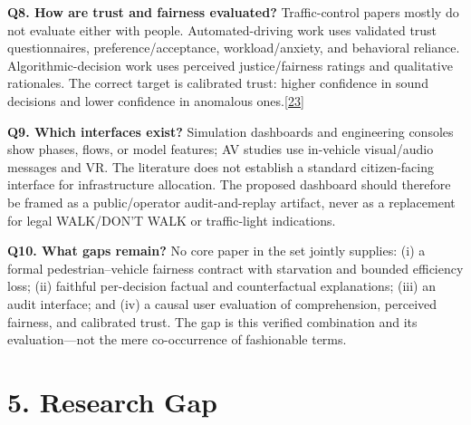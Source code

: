 \documentclass[
  english,
  11pt,
  a4paper,
]{article}
\begin{document}
\textbf{Q8. How are trust and fairness evaluated?} Traffic-control
papers mostly do not evaluate either with people. Automated-driving work
uses validated trust questionnaires, preference/acceptance,
workload/anxiety, and behavioral reliance. Algorithmic-decision work
uses perceived justice/fairness ratings and qualitative rationales. The
correct target is calibrated trust: higher confidence in sound decisions
and lower confidence in anomalous ones.\hyperref[source-23]{[23]}

\textbf{Q9. Which interfaces exist?} Simulation dashboards and
engineering consoles show phases, flows, or model features; AV studies
use in-vehicle visual/audio messages and VR. The literature does not
establish a standard citizen-facing interface for infrastructure
allocation. The proposed dashboard should therefore be framed as a
public/operator audit-and-replay artifact, never as a replacement for
legal WALK/DON'T WALK or traffic-light indications.

\textbf{Q10. What gaps remain?} No core paper in the set jointly
supplies: (i) a formal pedestrian--vehicle fairness contract with
starvation and bounded efficiency loss; (ii) faithful per-decision
factual and counterfactual explanations; (iii) an audit interface; and
(iv) a causal user evaluation of comprehension, perceived fairness, and
calibrated trust. The gap is this verified combination and its
evaluation---not the mere co-occurrence of fashionable terms.

\section{5. Research Gap}\label{research-gap}
\end{document}
